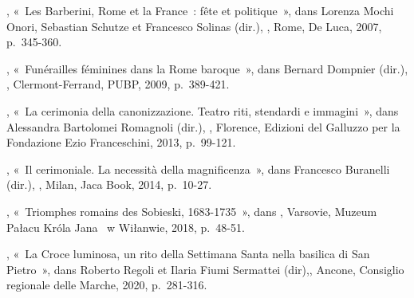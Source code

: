 \begin{teiElement}[name={TEI},change={commons\_edition}]
\begin{teiElement}[name={text},type={book},xmlid={book}]
\begin{teiElement}[name={group},type={book},xmlid={book-001}]
\begin{teiElement}[name={group},type={bibliography},data-page-title={Sources et bibliographie},data-include-href={Ch14\_Source\_bibliographie.xml},xmlid={bibliography-001}]
\begin{teiElement}[name={body}]
\begin{teiDiv}[type={section1},xmlid={div18}]
\begin{teiDiv}[type={section2},xmlid={div19}]
              \begin{teiBibl}[xmlid={bibl-334}]
, « Les Barberini, Rome et la France : fête et politique », dans Lorenza Mochi Onori, Sebastian Schutze et Francesco Solinas (dir.), , Rome, De Luca, 2007, p. 345-360.
\end{teiBibl}
              \begin{teiBibl}[xmlid={bibl-335}]
, « Funérailles féminines dans la Rome baroque », dans Bernard Dompnier (dir.), , Clermont-Ferrand, PUBP, 2009, p. 389-421.
\end{teiBibl}
              \begin{teiBibl}[xmlid={bibl-336}]
, « La cerimonia della canonizzazione. Teatro riti, stendardi e immagini », dans Alessandra Bartolomei Romagnoli (dir.), , Florence, Edizioni del Galluzzo per la Fondazione Ezio Franceschini, 2013, p. 99-121.
\end{teiBibl}
              \begin{teiBibl}[xmlid={bibl-337}]
, « Il cerimoniale. La necessità della magnificenza », dans Francesco Buranelli (dir.), , Milan, Jaca Book, 2014, p. 10-27.
\end{teiBibl}
              \begin{teiBibl}[xmlid={bibl-338}]
, « Triomphes romains des Sobieski, 1683-1735 », dans , Varsovie, Muzeum Pałacu Króla Jana  w Wiłanwie, 2018, p. 48-51.
\end{teiBibl}
              \begin{teiBibl}[xmlid={bibl-339}]
, « La Croce luminosa, un rito della Settimana Santa nella basilica di San Pietro », dans Roberto Regoli et Ilaria Fiumi Sermattei (dir),, Ancone, Consiglio regionale delle Marche, 2020, p. 281-316.
\end{teiBibl}
              \begin{teiBibl}[xmlid={bibl-340}]

\end{teiBibl}
\end{teiDiv}
\end{teiDiv}
\end{teiElement}
\end{teiElement}
\end{teiElement}
\end{teiElement}
\end{teiElement}
